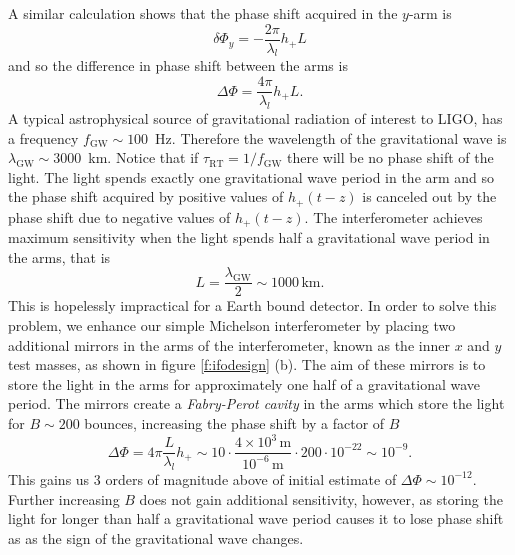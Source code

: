 A similar calculation shows that the phase shift acquired in the $y$-arm is
\begin{equation}
\delta \Phi_y = - \frac{2\pi}{\lambda_l} h_{+} L
\end{equation}
and so the difference in phase shift between the arms is
\begin{equation}
\Delta \Phi = \frac{4\pi}{\lambda_l} h_{+} L.
\end{equation}
A typical astrophysical source of gravitational radiation of interest to LIGO,
has a frequency $f_\mathrm{GW} \sim 100$~Hz. Therefore the wavelength of the
gravitational wave is $\lambda_\mathrm{GW} \sim 3000$~km. Notice that if
$\tau_\mathrm{RT} = 1 / f_\mathrm{GW}$ there will be no phase shift of the
light. The light spends exactly one gravitational wave period in the arm and
so the phase shift acquired by positive values of $h_+(t-z)$ is canceled out
by the phase shift due to negative values of $h_+(t-z)$. The interferometer
achieves maximum sensitivity when the light spends half a gravitational wave
period in the arms, that is
\begin{equation}
L = \frac{\lambda_\mathrm{GW}}{2} \sim 1000\,\mathrm{km}.
\end{equation}
This is hopelessly impractical for a Earth bound detector. In order to solve
this problem, we enhance our simple Michelson interferometer by placing two
additional mirrors in the arms of the interferometer, known as the inner $x$
and $y$ test masses, as shown in figure \ref{f:ifodesign} (b). The aim of
these mirrors is to store the light in the arms for approximately one half of
a gravitational wave period.  The mirrors create a \emph{Fabry-Perot cavity}
in the arms which store the light for $B \sim 200$ bounces, increasing the
phase shift by a factor of $B$
\begin{equation}
\Delta \Phi = 4\pi \frac{L}{\lambda_l} h_{+} \sim 
10 \cdot \frac{4 \times 10^3\,\mathrm{m}}{10^{-6}\,\mathrm{m}} \cdot 200 \cdot
10^{-22} \sim 10^{-9}.
\end{equation}
This gains us 3 orders of magnitude above of initial estimate of $\Delta \Phi
\sim 10^{-12}$.  Further increasing $B$ does not gain additional sensitivity,
however, as storing the light for longer than half a gravitational wave period
causes it to lose phase shift as as the sign of the gravitational wave
changes.

